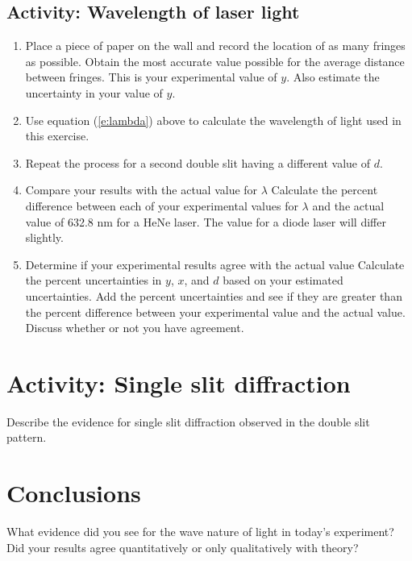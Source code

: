 \subsection{Activity: Wavelength of laser light}
\begin{enumerate}
	 \item 	Place a piece of paper on the wall and record the location of as many fringes as possible.  Obtain the most accurate value possible for the average distance between fringes.  This is your experimental value of $y$.  Also estimate the uncertainty in your value of $y$.
	 \item Use equation (\ref{e:lambda}) above to calculate the wavelength of light used in this exercise.
	 \item Repeat the process for a second double slit having a different value of $d$.
	 \item Compare your results with the actual value for $\lambda$
	Calculate the percent difference between each of your experimental values for $\lambda$ and the actual value of 632.8 nm for a HeNe laser. The value for a diode laser will differ slightly.
	\item Determine if your experimental results agree with the actual value
	Calculate the percent uncertainties in $y$, $x$, and $d$ based on your estimated uncertainties.  Add the percent uncertainties and see if they are greater than the percent difference between your experimental value and the actual value.  Discuss whether or not you have agreement.
\end{enumerate}

\section{Activity: Single slit diffraction}
	Describe the evidence for single slit diffraction observed in the double slit pattern.

\section {Conclusions} What evidence did you see for the wave nature of light in today's experiment?  Did your results agree quantitatively or only qualitatively with theory?
 
\endinput
